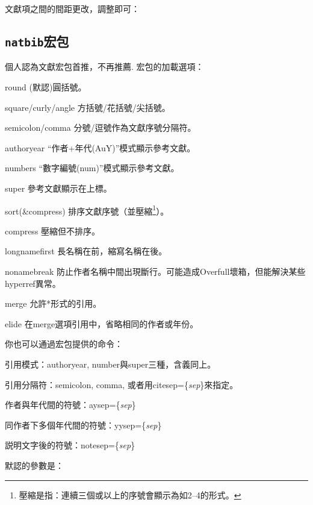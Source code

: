 文獻項之間的間距更改，調整即可：
\begin{latex}
\setlength{\bibsep}{1ex}
\end{latex}

\subsection{\texttt{natbib}宏包}
個人認為文獻宏包首推，不再推薦. 宏包的加載選項：
\begin{para}
\item[round] (默認)圓括號。
\item[square/curly/angle] 方括號/花括號/尖括號。
\item[semicolon/comma] 分號/逗號作為文獻序號分隔符。
\item[authoryear] “作者+年代(AuY)”模式顯示參考文獻。
\item[numbers] “數字編號(num)”模式顯示參考文獻。
\item[super] 參考文獻顯示在上標。
\item[sort(\&compress)] 排序文獻序號（並壓縮\footnote{壓縮是指：連續三個或以上的序號會顯示為如2--4的形式。}）。
\item[compress] 壓縮但不排序。
\item[longnamefirst] 長名稱在前，縮寫名稱在後。
\item[nonamebreak] 防止作者名稱中間出現斷行。可能造成Overfull壞箱，但能解決某些hyperref異常。
\item[merge] 允許*形式的引用。
\item[elide] 在merge選項引用中，省略相同的作者或年份。
\end{para}

你也可以通過宏包提供的命令：
\begin{feae}
\item 引用模式：authoryear, number與super三種，含義同上。
\item 引用分隔符：semicolon, comma, 或者用citesep=\{\textit{sep}\}來指定。
\item 作者與年代間的符號：aysep=\{\textit{sep}\}
\item 同作者下多個年代間的符號：yysep=\{\textit{sep}\}
\item 説明文字後的符號：notesep=\{\textit{sep}\}
\end{feae}

默認的參數是：
\begin{latex}
\end{latex}

